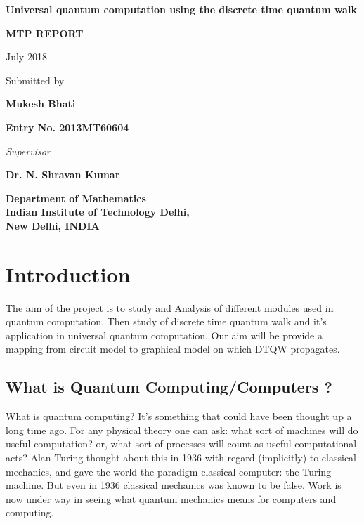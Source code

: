 \documentclass[11 pt]{article}
\theoremstyle{definition}
\theoremstyle{remark}
\begin{document}
\begin{center}
\begin{LARGE}
\textbf {Universal quantum computation using the discrete time quantum walk}
\end{LARGE}
\begin{center}
\end{center}
{\begin{Large}
\textbf{MTP REPORT} \\
\end{Large}}
July 2018
\end{center}

\vspace{45mm}
\begin{center}
Submitted by


\textbf{Mukesh Bhati}

\bf Entry No. 2013MT60604
\vspace{15mm}

\textit{Supervisor}

\textbf{Dr. N. Shravan Kumar}

\end{center}
\begin{center}
\textbf{{Department of Mathematics\\
Indian Institute of Technology Delhi,\\
New Delhi, INDIA}}
\end{center}
\thispagestyle{empty}
\newpage
\thispagestyle{empty}

\section{Introduction}
The aim of the project is to study and Analysis of different modules used in quantum computation. Then study of discrete time quantum walk and it's application in universal quantum computation. Our aim will be provide a mapping from circuit model to graphical model on which DTQW propagates.     
 \\

\subsection{What is Quantum Computing/Computers ?}
What is quantum computing? It's something that could have been thought up a long time ago. For any physical theory one can ask: what sort of machines will do useful computation? or, what sort of processes will count as useful computational acts? Alan Turing thought about this in 1936 with regard (implicitly) to classical mechanics, and gave the world the paradigm classical computer: the Turing machine. But even in 1936 classical mechanics was known to be false. Work is now under way in seeing what quantum mechanics means for computers and computing.
\end{document}
